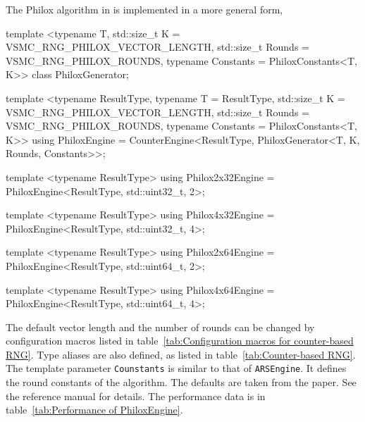 The Philox algorithm in \textcite{Salmon:2011um} is implemented in a more
general form,
\begin{cppcode}
  template <typename T, std::size_t K = VSMC_RNG_PHILOX_VECTOR_LENGTH,
      std::size_t Rounds = VSMC_RNG_PHILOX_ROUNDS,
      typename Constants = PhiloxConstants<T, K>>
  class PhiloxGenerator;

  template <typename ResultType, typename T = ResultType,
      std::size_t K = VSMC_RNG_PHILOX_VECTOR_LENGTH,
      std::size_t Rounds = VSMC_RNG_PHILOX_ROUNDS,
      typename Constants = PhiloxConstants<T, K>>
  using PhiloxEngine =
      CounterEngine<ResultType, PhiloxGenerator<T, K, Rounds, Constants>>;

  template <typename ResultType>
  using Philox2x32Engine = PhiloxEngine<ResultType, std::uint32_t, 2>;

  template <typename ResultType>
  using Philox4x32Engine = PhiloxEngine<ResultType, std::uint32_t, 4>;

  template <typename ResultType>
  using Philox2x64Engine = PhiloxEngine<ResultType, std::uint64_t, 2>;

  template <typename ResultType>
  using Philox4x64Engine = PhiloxEngine<ResultType, std::uint64_t, 4>;
\end{cppcode}
The default vector length and the number of rounds can be changed by
configuration macros listed in table~\ref{tab:Configuration macros for
  counter-based RNG}. Type aliases are also defined, as listed in
table~\ref{tab:Counter-based RNG}. The template parameter \verb|Counstants| is
similar to that of \verb|ARSEngine|. It defines the round constants of the
algorithm. The defaults are taken from the paper. See the reference manual for
details. The performance data is in table~\ref{tab:Performance of
  PhiloxEngine}.

